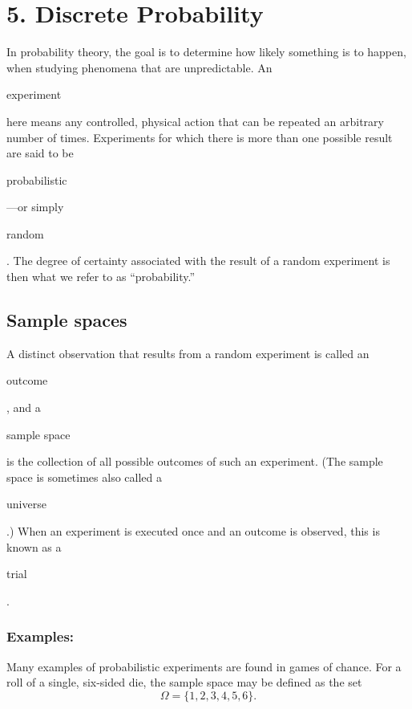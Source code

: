 \documentclass[11pt]{article}
\theoremstyle{plain}
\theoremstyle{definition}
\begin{document}
\section*{5. Discrete Probability}

In probability theory, the goal is to determine how likely something is to
happen, when studying phenomena that are unpredictable. An
\begin{em}experiment\end{em} here means any controlled, physical action that
can be repeated an arbitrary number of times. Experiments for which there is 
more than one possible result are said to be \begin{em}probabilistic\end{em}---or simply 
\begin{em}random\end{em}. The degree of certainty associated with the result of 
a random experiment is then what we refer to as ``probability.'' 

\subsection*{Sample spaces}

\noindent
A distinct observation that results from a random experiment is called an
\begin{em}outcome\end{em}, and a \begin{em}sample space\end{em} is the
collection of all possible outcomes of such an experiment. (The sample space is
sometimes also called a \begin{em}universe\end{em}.) When an experiment is 
executed once and an outcome is observed, this is known as a \begin{em}trial\end{em}.

\subsubsection*{Examples:}

Many examples of probabilistic experiments are found in games of chance. For a 
roll of a single, six-sided die, the sample space may be defined as the set
\begin{displaymath}
	\Omega = \{ 1, 2, 3, 4, 5, 6 \}.
\end{displaymath}
\end{document}
